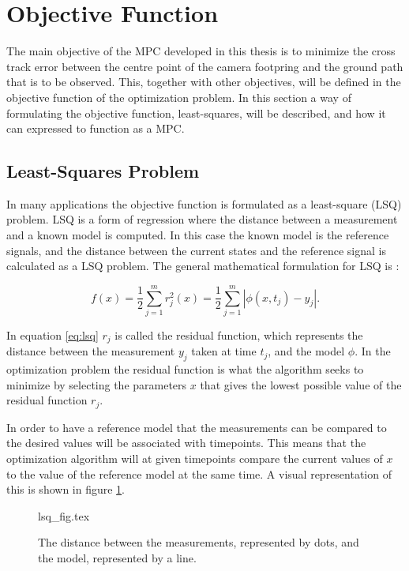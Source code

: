 \section{Objective Function}
\label{ch:objective_function}

The main objective of the MPC developed in this thesis is to minimize the cross track error between the centre point of the camera footpring and the ground path that is to be observed. This, together with other objectives, will be defined in the objective function of the optimization problem. In this section a way of formulating the objective function, least-squares, will be described, and how it can expressed to function as a MPC.


\subsection{Least-Squares Problem}

In many applications the objective function is formulated as a least-square (LSQ) problem. LSQ is a form of regression where the distance between a measurement and a known model is computed. In this case the known model is the reference signals, and the distance between the current states and the reference signal is calculated as a LSQ problem. The general mathematical formulation for LSQ is \cite{nocedalOPTIMIZATION}:

\begin{equation}
	\label{eq:lsq}
	f(x) = \frac{1}{2} \sum_{j=1}^m r_j^2(x) = \frac{1}{2} \sum_{j=1}^m |\phi(x, t_j) - y_j|.
\end{equation}

In equation \ref{eq:lsq} $r_j$ is called the residual function, which represents the distance between the measurement $y_j$ taken at time $t_j$, and the model $\phi$. In the optimization problem the residual function is what the algorithm seeks to minimize by selecting the parameters $x$ that gives the lowest possible value of the residual function $r_j$.

In order to have a reference model that the measurements can be compared to the desired values will be associated with timepoints. This means that the optimization algorithm will at given timepoints compare the current values of $x$ to the value of the reference model at the same time. A visual representation of this is shown in figure \ref{fig:lsq}.

\begin{figure}
	{lsq_fig.tex}
	\caption{The distance between the measurements, represented by dots, and the model, represented by a line.}
	\label{fig:lsq}
\end{figure}



